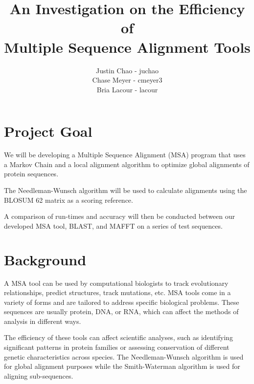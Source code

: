 \documentclass{article}
\newcommand{\subtitle}[1]{%
    \posttitle{%
        \par\end{center}
        \begin{center}\LARGE#1\end{center}
        \vskip0.5em}%
}
\begin{document}
\title{An Investigation on the Efficiency of \\ Multiple Sequence Alignment Tools}
\subtitle{Mid-Project Review}
\author {Justin Chao - juchao \\
		Chase Meyer - cmeyer3 \\
		Bria Lacour - lacour}
\maketitle

\section*{Project Goal}
We will be developing a Multiple Sequence Alignment (MSA) program that uses a
Markov Chain and a local alignment algorithm to optimize global alignments of
protein sequences.

The Needleman-Wunsch algorithm will be used to calculate alignments using the
BLOSUM 62 matrix as a scoring reference.

A comparison of run-times and accuracy will then be conducted
between our developed MSA tool, BLAST, and MAFFT on a series of test sequences. 

\section*{Background}
A MSA tool can be used by computational biologists to track evolutionary
relationships, predict structures, track mutations, etc. MSA tools come in a
variety of forms and are tailored to address specific biological problems.
These sequences are usually protein, DNA, or RNA, which can affect the methods
of analysis in different ways.  

The efficiency of these tools can affect scientific analyses, such as
identifying significant patterns in protein families or assessing conservation
of different genetic characteristics across species. 
The Needleman-Wunsch algorithm is used for global alignment purposes while the
Smith-Waterman algorithm is used for aligning sub-sequences. 
\end{document}
